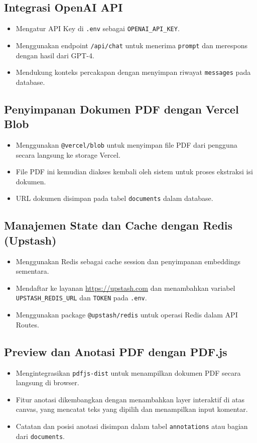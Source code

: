 \subsection{Integrasi OpenAI API}

\begin{itemize}
  \item Mengatur API Key di \texttt{.env} sebagai \texttt{OPENAI\_API\_KEY}.
  \item Menggunakan endpoint \texttt{/api/chat} untuk menerima \texttt{prompt} dan merespons dengan hasil dari GPT-4.
  \item Mendukung konteks percakapan dengan menyimpan riwayat \texttt{messages} pada database.
\end{itemize}

\subsection{Penyimpanan Dokumen PDF dengan Vercel Blob}

\begin{itemize}
  \item Menggunakan \texttt{@vercel/blob} untuk menyimpan file PDF dari pengguna secara langsung ke storage Vercel.
  \item File PDF ini kemudian diakses kembali oleh sistem untuk proses ekstraksi isi dokumen.
  \item URL dokumen disimpan pada tabel \texttt{documents} dalam database.
\end{itemize}

\subsection{Manajemen State dan Cache dengan Redis (Upstash)}
\begin{itemize}
  \item Menggunakan Redis sebagai cache session dan penyimpanan embeddings sementara.
  \item Mendaftar ke layanan \url{https://upstash.com} dan menambahkan variabel \texttt{UPSTASH\_REDIS\_URL} dan \texttt{TOKEN} pada \texttt{.env}.
  \item Menggunakan package \texttt{@upstash/redis} untuk operasi Redis dalam API Routes.
\end{itemize}

\subsection{Preview dan Anotasi PDF dengan PDF.js}
\begin{itemize}
  \item Mengintegrasikan \texttt{pdfjs-dist} untuk menampilkan dokumen PDF secara langsung di browser.
  \item Fitur anotasi dikembangkan dengan menambahkan layer interaktif di atas canvas, yang mencatat teks yang dipilih dan menampilkan input komentar.
  \item Catatan dan posisi anotasi disimpan dalam tabel \texttt{annotations} atau bagian dari \texttt{documents}.
\end{itemize}